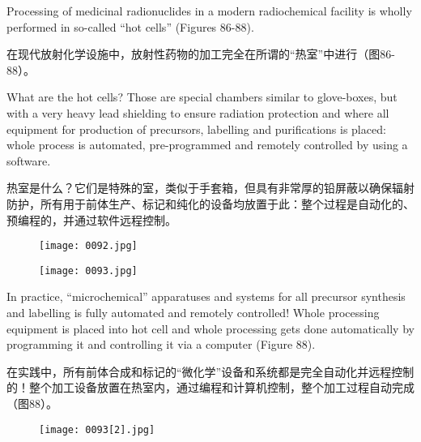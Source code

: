 \documentclass[dvipsnames, svgnames,a4paper,11pt]{article}
\begin{document}
Processing of medicinal radionuclides in a modern radiochemical facility is wholly
performed in so-called “hot cells” (Figures 86-88).

在现代放射化学设施中，放射性药物的加工完全在所谓的“热室”中进行（图86-88）。



What are the hot cells? Those are special chambers similar to glove-boxes, but with
a very heavy lead shielding to ensure radiation protection and where all equipment
for production of precursors, labelling and purifications is placed: whole process is
automated, pre-programmed and remotely controlled by using a software.

热室是什么？它们是特殊的室，类似于手套箱，但具有非常厚的铅屏蔽以确保辐射防护，所有用于前体生产、标记和纯化的设备均放置于此：整个过程是自动化的、预编程的，并通过软件远程控制。

\begin{figure}[H]
    \centering
    \texttt{[image: 0092.jpg]}
     \label{fig86}
\end{figure}

\begin{figure}[H]
    \centering
    \texttt{[image: 0093.jpg]}
     \label{fig87}
\end{figure}

In practice, “microchemical” apparatuses and systems for all precursor synthesis and
labelling is fully automated and remotely controlled! Whole processing equipment is
placed into hot cell and whole processing gets done automatically by programming it
and controlling it via a computer (Figure 88).

在实践中，所有前体合成和标记的“微化学”设备和系统都是完全自动化并远程控制的！整个加工设备放置在热室内，通过编程和计算机控制，整个加工过程自动完成（图88）。

\begin{figure}[H]
    \centering
    \texttt{[image: 0093[2].jpg]}
     \label{fig88}
\end{figure}
\end{document}
